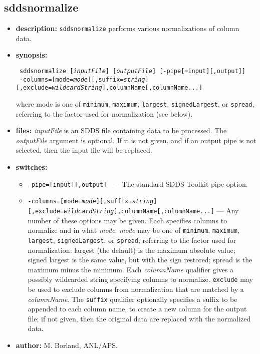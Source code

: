 \newpage
\subsection{sddsnormalize}
\label{sddsnormalize}

\begin{itemize}
\item {\bf description:} \verb|sddsnormalize| performs various normalizations of
column data.
\item {\bf synopsis:} 
\begin{flushleft}{\tt
sddsnormalize [{\em inputFile}] [{\em outputFile}] [-pipe[=input][,output]] \\ \ 
-columns=[mode={\em mode}][,suffix={\em string}][,exclude={\em wildcardString}],{columnName}[,{columnName}...]
}\end{flushleft}
where mode is one of {\tt minimum}, {\tt maximum}, {\tt largest}, {\tt signedLargest},
or {\tt spread}, referring to the factor used for normalization (see below).
\item {\bf files:}
{\em inputFile} is an SDDS file containing data to be processed.  The {\em outputFile} argument is
optional.  If it is not given, and if an output pipe is not selected, then the input file will be
replaced.
\item {\bf switches:}
    \begin{itemize}
    \item {\tt -pipe=[input][,output] } --- The standard SDDS Toolkit pipe option.
    \item {\tt -columns=[mode={\em mode}][,suffix={\em string}]} 
        {\tt [,exclude={\em wildcardString}],{columnName}[,{columnName}...]} --- 
Any number of these options may be given.
Each specifies columns to normalize and in what {\em mode}.  {\em mode} may be
one of {\tt minimum}, {\tt maximum}, {\tt largest}, {\tt signedLargest},
or {\tt spread}, referring to the factor used for normalization:
largest (the default) is the maximum absolute value; signed largest is the
same value, but with the sign restored; spread is the maximum minus the minimum.
Each {\em columnName} qualifier gives a possibly wildcarded string specifying
columns to normalize.  {\tt exclude} may be used to exclude columns from normalization
that are matched by a {\em columnName}.
The {\tt suffix} qualifier optionally specifies a suffix to be appended to each
column name, to create a new column for the output file; if not given, then the
original data are replaced with the normalized data.
    \end{itemize}
\item {\bf author:} M. Borland, ANL/APS.
\end{itemize}


